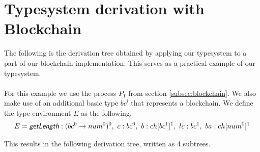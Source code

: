 \section{Typesystem derivation with Blockchain}
The following is the derivation tree obtained by applying our typesystem to a part of our blockchain implementation.
This serves as a practical example of our typesystem.\\\\

For this example we use the process $P_1$ from section \ref{subsec:blockchain}.
We also make use of an additional basic type $bc^l$ that represents a blockchain.
We define the type environment $E$ as the following.
\begin{align*}
	E=\mop{getLength}:(bc^0\ra num^0)^0,\ c:bc^0,\ b:ch[bc^1]^1,\ lc:bc^1,\  ba:ch[num^0]^1
\end{align*}

This results in the following derivation tree, written as 4 subtrees.
\begin{prooftree}
\end{prooftree}
\vspace{10pt}
\begin{prooftree}
\end{prooftree}
\vspace{10pt}
\begin{prooftree}
\end{prooftree}
\vspace{10pt}
\begin{prooftree}
\end{prooftree}